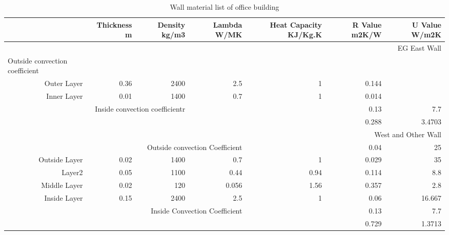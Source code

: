 \documentclass[11pt, a4paper]{article}
\theoremstyle{definition}
\begin{document}
			
			\newpage
			\begin{table}[h!]
			  \centering
			\caption{Wall material list of office building}
			    \begin{tabular}{rrrrrrr}
			    \toprule
			         & \multicolumn{1}{p{4em}}{Thickness \newline{}m} & \multicolumn{1}{p{3.145em}}{Density \newline{}kg/m3} & \multicolumn{1}{p{3.285em}}{Lambda \newline{}W/MK} & \multicolumn{1}{p{3.57em}}{Heat Capacity\newline{} KJ/Kg.K} & \multicolumn{1}{p{2.93em}}{R Value \newline{}m2K/W} & \multicolumn{1}{p{3.145em}}{U Value \newline{}W/m2K} \\
			    \midrule
			    \multicolumn{7}{p{26.86em}}{EG East Wall} \\
			    \multicolumn{1}{l}{Outside convection coefficient} &      &      &      &      &      &  \\
			    \multicolumn{1}{p{6.785em}}{Outer Layer} & 0.36 & 2400 & 2.5  & 1    & 0.144 &  \\
			    \multicolumn{1}{p{6.785em}}{Inner Layer} & 0.01 & 1400 & 0.7  & 1    & 0.014 &  \\
			    \multicolumn{3}{p{13.93em}}{Inside convection coefficientr} &      &      & 0.13 & 7.7 \\
			         &      &      &      &      & 0.288 & 3.4703 \\
			    \midrule
			    \multicolumn{7}{p{26.86em}}{West and Other Wall} \\
			    \multicolumn{4}{p{17.215em}}{Outside convection Coefficient} &      & 0.04 & 25 \\
			    \multicolumn{1}{p{6.785em}}{Outside Layer} & 0.02 & 1400 & 0.7  & 1    & 0.029 & 35 \\
			    \multicolumn{1}{p{6.785em}}{Layer2} & 0.05 & 1100 & 0.44 & 0.94 & 0.114 & 8.8 \\
			    \multicolumn{1}{p{6.785em}}{Middle Layer} & 0.02 & 120  & 0.056 & 1.56 & 0.357 & 2.8 \\
			    \multicolumn{1}{p{6.785em}}{Inside Layer} & 0.15 & 2400 & 2.5  & 1    & 0.06 & 16.667 \\
			    \multicolumn{4}{p{17.215em}}{Inside Convection Coefficient} &      & 0.13 & 7.7 \\
			         &      &      &      &      & 0.729 & 1.3713 \\

\end{tabular}
\end{table}
\end{document}

